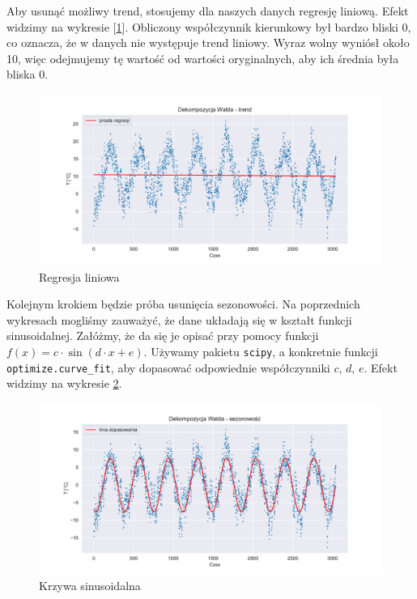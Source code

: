 \documentclass{article}
\theoremstyle{break}
\newcommand{\code}[1]{\colorbox{light-gray}{\texttt{#1}}}
\begin{document}
Aby usunąć możliwy trend, stosujemy dla naszych danych regresję liniową. Efekt widzimy na wykresie [\ref*{fig:p2}]. Obliczony współczynnik kierunkowy był bardzo bliski 0, co oznacza, że w danych nie występuje trend liniowy. Wyraz wolny wyniósł około 10, więc odejmujemy tę wartość od wartości oryginalnych, aby ich średnia była bliska 0.

\begin{figure}[H]
	\begin{center}
		\includegraphics[scale=0.63]{plot2.pdf}
		\caption{Regresja liniowa}
		\label{fig:p2}
	\end{center}
\end{figure}

Kolejnym krokiem będzie próba usunięcia sezonowości. Na poprzednich wykresach mogliśmy zauważyć, że dane układają się w kształt funkcji sinusoidalnej. Załóżmy, że da się je opisać przy pomocy funkcji $f(x) = c\cdot\sin(d\cdot x+e)$. Używamy pakietu \code{scipy}, a konkretnie funkcji \code{optimize.curve\_fit}, aby dopasować odpowiednie współczynniki $c$, $d$, $e$. Efekt widzimy na wykresie \ref{fig:p3}.

\begin{figure}[H]
	\begin{center}
		\includegraphics[scale=0.63]{plot3.pdf}
		\caption{Krzywa sinusoidalna}
		\label{fig:p3}
	\end{center}
\end{figure}
\end{document}
